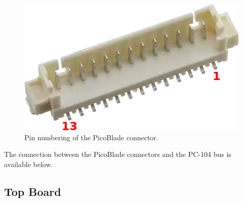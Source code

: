 \begin{figure}[!htb]
    \begin{center}
        \includegraphics[width=0.5\columnwidth]{figures/picoblade-pin-ref}
        \caption{Pin numbering of the PicoBlade connector.}
        \label{fig:picoblade-pin-ref}
    \end{center}
\end{figure}

The connection between the PicoBlade connectors and the PC-104 bus is available below.

\subsection{Top Board}

